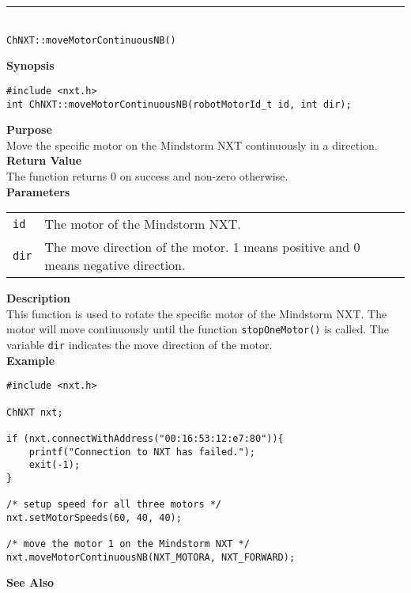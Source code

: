 \noindent
\vspace{5pt}
\rule{4.5in}{0.015in}\\
\noindent
{\LARGE \texttt{ChNXT::moveMotorContinuousNB()} }\\


\noindent
{\bf Synopsis}
\begin{lstlisting}
#include <nxt.h>
int ChNXT::moveMotorContinuousNB(robotMotorId_t id, int dir);
\end{lstlisting}

\noindent
{\bf Purpose}\\
Move the specific motor on the Mindstorm NXT continuously in a direction.\\

\noindent
{\bf Return Value}\\
The function returns 0 on success and non-zero otherwise.\\

\noindent
{\bf Parameters}\\
\vspace{-0.1in}
\begin{description}
\item               
\begin{tabular}{p{15 mm}p{125 mm}}
\texttt{id}      &The motor of the Mindstorm NXT.\\
\texttt{dir}     &The move direction of the motor. 1 means positive and 0 means negative direction.\\
\end{tabular}
\end{description}

\noindent
{\bf Description}\\
This function is used to rotate the specific motor of the Mindstorm NXT. The motor will move continuously until the function 
\texttt{stopOneMotor()} is called. The variable \texttt{dir} indicates the move direction of the motor. \\


\noindent
{\bf Example}
\begin{lstlisting}
#include <nxt.h> 

ChNXT nxt;

if (nxt.connectWithAddress("00:16:53:12:e7:80")){
    printf("Connection to NXT has failed.");
    exit(-1);
}
 
/* setup speed for all three motors */
nxt.setMotorSpeeds(60, 40, 40);

/* move the motor 1 on the Mindstorm NXT */
nxt.moveMotorContinuousNB(NXT_MOTORA, NXT_FORWARD);
\end{lstlisting}

\noindent
{\bf See Also}\\
